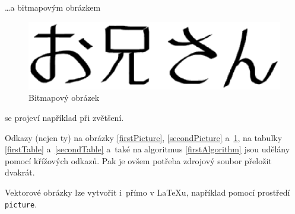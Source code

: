 \documentclass[11pt, a4paper]{article}
\begin{document}
\dots a bitmapovým obrázkem

\begin{figure}[ht]
\centering
\includegraphics[scale=0.6]{oniisan2.eps}
\caption{Bitmapový obrázek}
\label{thirdPicture}
\end{figure}

\noindent
se projeví například při zvětšení.

Odkazy (nejen ty) na obrázky \ref{firstPicture}, \ref{secondPicture} a~\ref{thirdPicture}, na tabulky \ref{firstTable} a~\ref{secondTable} a~také na algoritmus \ref{firstAlgorithm} jsou udělány pomocí křížových odkazů. Pak je ovšem potřeba zdrojový soubor přeložit dvakrát.

Vektorové obrázky lze vytvořit i~přímo v \LaTeX u, například pomocí prostředí \verb|picture|.

\newpage
\end{document}
